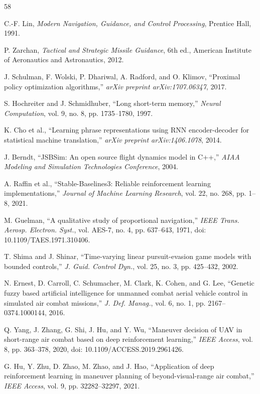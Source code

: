 \documentclass[conference]{IEEEtran}
\begin{document}


\begin{thebibliography}{58}

C.-F. Lin, \emph{Modern Navigation, Guidance, and Control Processing}, Prentice Hall, 1991.

P. Zarchan, \emph{Tactical and Strategic Missile Guidance}, 6th ed., American Institute of Aeronautics and Astronautics, 2012.

J. Schulman, F. Wolski, P. Dhariwal, A. Radford, and O. Klimov,
``Proximal policy optimization algorithms,''
\emph{arXiv preprint arXiv:1707.06347}, 2017.

S. Hochreiter and J. Schmidhuber,
``Long short-term memory,''
\emph{Neural Computation}, vol. 9, no. 8, pp. 1735--1780, 1997.

K. Cho et al.,
``Learning phrase representations using RNN encoder-decoder for statistical machine translation,''
\emph{arXiv preprint arXiv:1406.1078}, 2014.

J. Berndt,
``JSBSim: An open source flight dynamics model in C++,''
\emph{AIAA Modeling and Simulation Technologies Conference}, 2004.

A. Raffin et al.,
``Stable-Baselines3: Reliable reinforcement learning implementations,''
\emph{Journal of Machine Learning Research}, vol. 22, no. 268, pp. 1--8, 2021.

M. Guelman,
``A qualitative study of proportional navigation,''
\emph{IEEE Trans. Aerosp. Electron. Syst.}, vol. AES-7, no. 4, pp. 637--643, 1971,
doi: 10.1109/TAES.1971.310406.

T. Shima and J. Shinar,
``Time-varying linear pursuit-evasion game models with bounded controls,''
\emph{J. Guid. Control Dyn.}, vol. 25, no. 3, pp. 425--432, 2002.

N. Ernest, D. Carroll, C. Schumacher, M. Clark, K. Cohen, and G. Lee,
``Genetic fuzzy based artificial intelligence for unmanned combat aerial vehicle control in simulated air combat missions,''
\emph{J. Def. Manag.}, vol. 6, no. 1, pp. 2167--0374.1000144, 2016.

Q. Yang, J. Zhang, G. Shi, J. Hu, and Y. Wu,
``Maneuver decision of UAV in short-range air combat based on deep reinforcement learning,''
\emph{IEEE Access}, vol. 8, pp. 363--378, 2020,
doi: 10.1109/ACCESS.2019.2961426.

G. Hu, Y. Zhu, D. Zhao, M. Zhao, and J. Hao,
``Application of deep reinforcement learning in maneuver planning of beyond-visual-range air combat,''
\emph{IEEE Access}, vol. 9, pp. 32282--32297, 2021.


\end{thebibliography}
\end{document}
